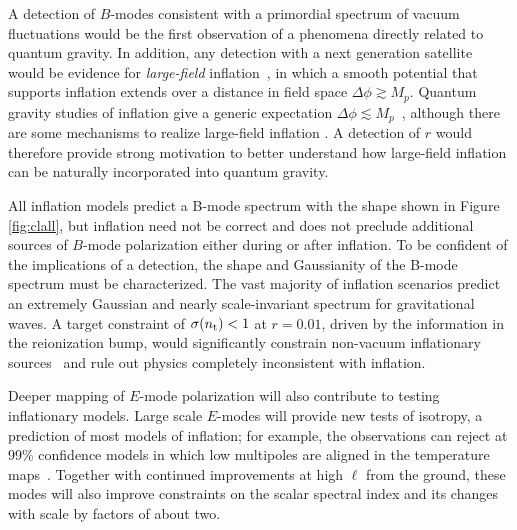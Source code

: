 A detection of $B$-modes consistent with a primordial spectrum of vacuum fluctuations would be the first observation 
of a phenomena directly related to quantum gravity. In addition, any detection with a next generation satellite would be 
evidence for {\it large-field} inflation~\cite{Lyth:1996im}, in which a smooth potential that supports inflation extends over 
a distance in field space $\Delta\phi \gtrsim M_p$. Quantum gravity studies of inflation give a generic 
expectation $\Delta\phi \lesssim M_p$~\cite{Banks:2003sx,Baumann:2014nda,Brown:2015iha,Rudelius:2015xta}, although 
there are some mechanisms to realize large-field inflation \cite{Silverstein:2008sg,Kaloper:2008fb,Marchesano:2014mla,Blumenhagen:2015xpa}. 
A detection of $r$ would therefore provide strong 
motivation to better understand how large-field inflation can be naturally incorporated into quantum gravity. 

All inflation models predict a B-mode spectrum with the shape shown in Figure \ref{fig:clall}, but inflation 
need not be correct \cite{Khoury:2001bz,Brandenberger:2012zb,Ijjas:2015hcc} and does not preclude additional sources of $B$-mode polarization either during or after 
inflation. To be confident of the implications of a detection, the shape and Gaussianity of the B-mode spectrum 
must be characterized. The vast majority of inflation scenarios predict an extremely Gaussian and nearly scale-invariant spectrum for 
gravitational waves. A target constraint of $\sigma(n_{\rm t})<1$ at $r=0.01$, driven by the information in the reionization bump, would significantly constrain non-vacuum 
inflationary sources~\cite{Namba:2015gja,Peloso:2016gqs} and rule out physics completely inconsistent with inflation. 

Deeper mapping of $E$-mode polarization will also contribute to testing inflationary models. Large scale $E$-modes will 
provide new tests of isotropy, a prediction of most models of inflation;  
for example, the observations can reject at 99\% confidence models in which low multipoles are aligned in the temperature maps~\cite{Dvorkin:2007jp}. 
Together with continued improvements at high $\ell$ from the ground, these modes will also improve constraints on the scalar 
spectral index and its changes with scale by factors of about two. 

